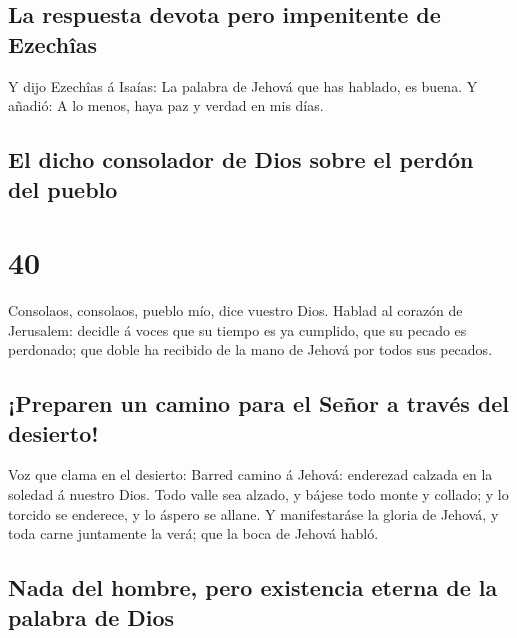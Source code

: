 \hypertarget{la-respuesta-devota-pero-impenitente-de-ezechuxeeas}{%
\subsection{La respuesta devota pero impenitente de
Ezechîas}\label{la-respuesta-devota-pero-impenitente-de-ezechuxeeas}}

 Y dijo Ezechîas á Isaías: La palabra de Jehová que has
hablado, es buena. Y añadió: A lo menos, haya paz y verdad en mis días.

\hypertarget{el-dicho-consolador-de-dios-sobre-el-perduxf3n-del-pueblo}{%
\subsection{El dicho consolador de Dios sobre el perdón del
pueblo}\label{el-dicho-consolador-de-dios-sobre-el-perduxf3n-del-pueblo}}

\hypertarget{section-23-40}{%
\section{40}\label{section-23-40}}

 Consolaos, consolaos, pueblo mío, dice vuestro Dios.
 Hablad al corazón de Jerusalem: decidle á voces que su
tiempo es ya cumplido, que su pecado es perdonado; que doble ha recibido
de la mano de Jehová por todos sus pecados.

\hypertarget{preparen-un-camino-para-el-seuxf1or-a-travuxe9s-del-desierto}{%
\subsection{¡Preparen un camino para el Señor a través del
desierto!}\label{preparen-un-camino-para-el-seuxf1or-a-travuxe9s-del-desierto}}

 Voz que clama en el desierto: Barred camino á Jehová:
enderezad calzada en la soledad á nuestro Dios.  Todo
valle sea alzado, y bájese todo monte y collado; y lo torcido se
enderece, y lo áspero se allane.  Y manifestaráse la
gloria de Jehová, y toda carne juntamente la verá; que la boca de Jehová
habló.

\hypertarget{nada-del-hombre-pero-existencia-eterna-de-la-palabra-de-dios}{%
\subsection{Nada del hombre, pero existencia eterna de la palabra de
Dios}\label{nada-del-hombre-pero-existencia-eterna-de-la-palabra-de-dios}}

